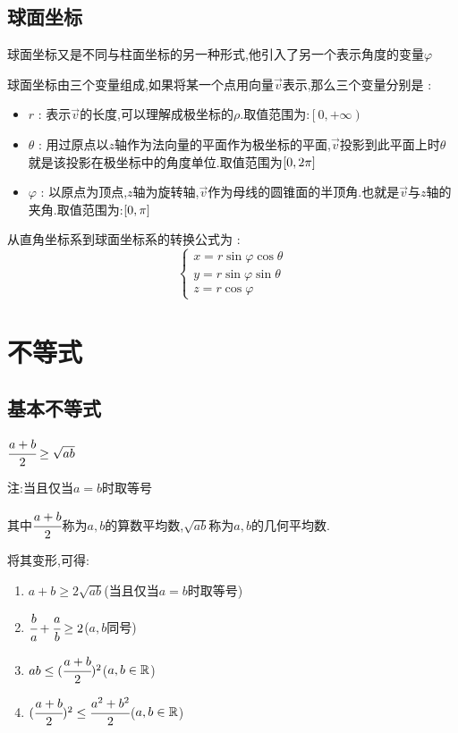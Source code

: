 {{    \subsection{球面坐标}{
        球面坐标又是不同与柱面坐标的另一种形式,他引入了另一个表示角度的变量$\varphi$

        球面坐标由三个变量组成,如果将某一个点用向量$\vec{v}$表示,那么三个变量分别是 :
        \begin{itemize}
            \item $r$ : 表示$\vec{v}$的长度,可以理解成极坐标的$\rho$.取值范围为:$\left[0,+\infty\right)$
            \item $\theta$ : 用过原点以$z$轴作为法向量的平面作为极坐标的平面,$\vec{v}$投影到此平面上时$\theta$就是该投影在极坐标中的角度单位.取值范围为$\left[0,2\pi\right]$
            \item $\varphi$ : 以原点为顶点,$z$轴为旋转轴,$\vec{v}$作为母线的圆锥面的半顶角.也就是$\vec{v}$与$z$轴的夹角.取值范围为:$\left[0,\pi\right]$
        \end{itemize}

        从直角坐标系到球面坐标系的转换公式为 :
        $$
            \begin{cases}
                x = r\sin\varphi\cos\theta \\
                y = r\sin\varphi\sin\theta \\
                z = r\cos\varphi
            \end{cases}
        $$
    }%

}%

\section{不等式}{

\subsection{基本不等式}{
    $\cfrac{a + b}{2} \geq \sqrt{ab}$

    注:当且仅当$a = b$时取等号

    其中$\cfrac{a+b}{2}$称为$a,b$的算数平均数,$\sqrt{ab}$称为$a,b$的几何平均数.

    将其变形,可得:
    \begin{enumerate}
        \item $a + b \geq 2\sqrt{ab}$(当且仅当$a = b$时取等号)
        \item $\cfrac{b}{a} + \cfrac{a}{b} \geq 2$($a,b$同号)
        \item $ab \leq (\cfrac{a + b}{2})^2$($a,b\in\operatorname{\mathbb{R}}$)
        \item $(\cfrac{a + b}{2})^2 \leq \cfrac{a^2 + b^2}{2}$($a,b\in\operatorname{\mathbb{R}}$)
    \end{enumerate}
}%


}}
